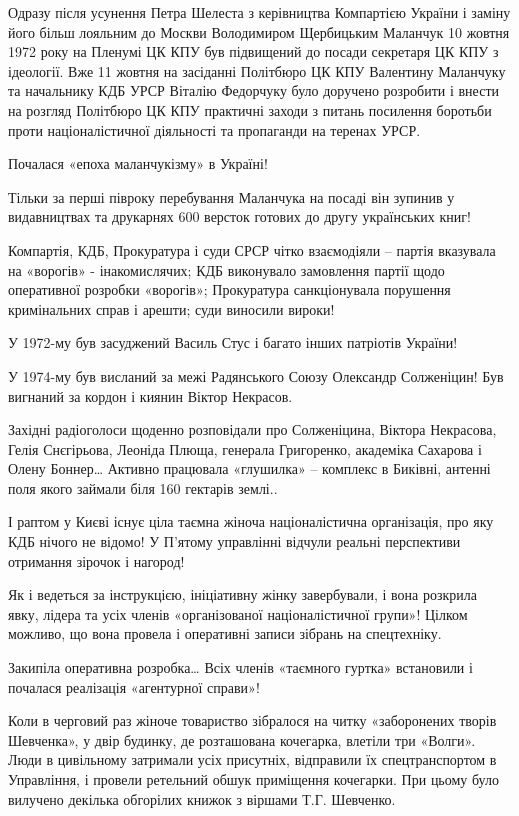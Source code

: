 Одразу після усунення Петра Шелеста з керівництва Компартією України і заміну
його більш лояльним до Москви Володимиром Щербицьким Маланчук 10 жовтня 1972
року на Пленумі ЦК КПУ був підвищений до посади секретаря ЦК КПУ з ідеології.
Вже 11 жовтня на засіданні Політбюро ЦК КПУ Валентину Маланчуку та начальнику
КДБ УРСР Віталію Федорчуку було  доручено розробити і внести на розгляд
Політбюро ЦК КПУ практичні заходи з питань посилення боротьби проти
націоналістичної діяльності та пропаганди на теренах УРСР. 

Почалася «епоха маланчукізму» в Україні! 

Тільки за перші півроку перебування Маланчука на посаді він зупинив у
видавництвах та друкарнях 600 версток готових до другу українських книг!

Компартія, КДБ, Прокуратура і суди СРСР чітко взаємодіяли – партія вказувала на
«ворогів» - інакомислячих; КДБ виконувало замовлення партії щодо оперативної
розробки «ворогів»; Прокуратура санкціонувала порушення кримінальних справ і
арешти; суди виносили вироки!

У 1972-му був засуджений Василь Стус і багато інших патріотів України! 

У 1974-му був висланий за межі Радянського Союзу Олександр Солженіцин! Був
вигнаний за кордон і киянин Віктор Некрасов. 

Західні радіоголоси щоденно розповідали про Солженіцина, Віктора Некрасова,
Гелія Снєгірьова, Леоніда Плюща, генерала Григоренко, академіка Сахарова і
Олену Боннер… Активно працювала «глушилка» – комплекс в Биківні, антенні поля
якого займали біля 160 гектарів землі..

І раптом у Києві існує ціла таємна жіноча націоналістична організація, про яку
КДБ нічого не відомо! У П’ятому управлінні відчули реальні перспективи
отримання зірочок і нагород!

Як і ведеться за інструкцією, ініціативну жінку завербували, і вона розкрила
явку, лідера та усіх членів «організованої націоналістичної групи»! Цілком
можливо, що вона провела і оперативні записи зібрань на спецтехніку. 

Закипіла оперативна розробка… Всіх членів «таємного гуртка» встановили і
почалася реалізація «агентурної справи»!

Коли в черговий раз жіноче товариство зібралося на читку «заборонених творів
Шевченка», у двір будинку, де розташована кочегарка, влетіли три «Волги». Люди
в цивільному затримали усіх присутніх, відправили їх спецтранспортом в
Управління, і провели ретельний обшук приміщення кочегарки. При цьому було
вилучено декілька обгорілих книжок з віршами Т.Г. Шевченко.


